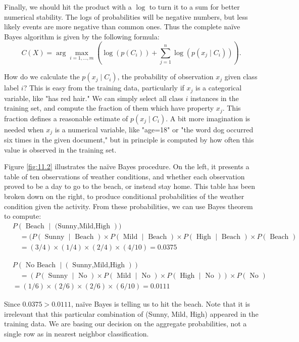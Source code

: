 \documentclass[10pt]{article}
\begin{document}
\begin{enumerate}
Finally, we should hit the product with a $\log$ to turn it to a sum for better numerical stability. The logs of probabilities will be negative numbers, but less likely events are more negative than common ones. Thus the complete naïve Bayes algorithm is given by the following formula:
\[
C(X) = \arg \max_{i = 1, \ldots, m} \left( \log(p(C_i)) + \sum_{j=1}^{n} \log(p(x_j \mid C_i)) \right).
\]

How do we calculate the $p(x_j \mid C_i)$, the probability of observation $x_j$ given class label $i$? This is easy from the training data, particularly if $x_j$ is a categorical variable, like "has red hair." We can simply select all class $i$ instances in the training set, and compute the fraction of them which have property $x_j$. This fraction defines a reasonable estimate of $p(x_j \mid C_i)$. A bit more imagination is needed when $x_j$ is a numerical variable, like "age=18" or "the word dog occurred six times in the given document," but in principle is computed by how often this value is observed in the training set.

Figure \ref{fig:11.2} illustrates the naïve Bayes procedure. On the left, it presents a table of ten observations of weather conditions, and whether each observation proved to be a day to go to the beach, or instead stay home. This table has been broken down on the right, to produce conditional probabilities of the weather condition given the activity. From these probabilities, we can use Bayes theorem to compute:
\[
\begin{aligned}
& P(\text { Beach } \mid \text { (Sunny,Mild,High })) \\
& \quad=(P(\text { Sunny } \mid \text { Beach }) \times P(\text { Mild } \mid \text { Beach }) \times P(\text { High } \mid \text { Beach }) \times P(\text { Beach }) \\
& \quad=(3 / 4) \times(1 / 4) \times(2 / 4) \times(4 / 10)=0.0375
\end{aligned}
\]

\[
\begin{aligned}
& P(\text { No Beach } \mid(\text { Sunny,Mild,High })) \\
& \quad=(P(\text { Sunny } \mid \text { No }) \times P(\text { Mild } \mid \text { No }) \times P(\text { High } \mid \text { No })) \times P(\text { No }) \\
&=(1 / 6) \times(2 / 6) \times(2 / 6) \times(6 / 10)=0.0111
\end{aligned}
\]

Since $0.0375>0.0111$, naïve Bayes is telling us to hit the beach. Note that it is irrelevant that this particular combination of (Sunny, Mild, High) appeared in the training data. We are basing our decision on the aggregate probabilities, not a single row as in nearest neighbor classification.


\end{enumerate}
\end{document}
